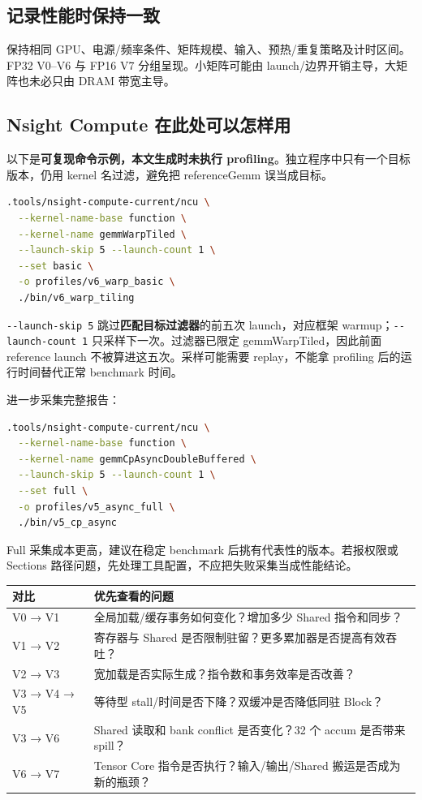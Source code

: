 \documentclass[UTF8,11pt,a4paper,fontset=fandol]{ctexart}
\newcommand{\code}[1]{\nolinkurl{#1}}
\newcommand{\pagebreakhere}{\clearpage}
\begin{document}
\subsection{记录性能时保持一致}
保持相同 GPU、电源/频率条件、矩阵规模、输入、预热/重复策略及计时区间。FP32 V0--V6 与 FP16 V7 分组呈现。小矩阵可能由 launch/边界开销主导，大矩阵也未必只由 DRAM 带宽主导。
\pagebreakhere

\subsection{Nsight Compute 在此处可以怎样用}
以下是\textbf{可复现命令示例，本文生成时未执行 profiling}。独立程序中只有一个目标版本，仍用 kernel 名过滤，避免把 referenceGemm 误当成目标。
\begin{lstlisting}[language=bash,numbers=none]
.tools/nsight-compute-current/ncu \
  --kernel-name-base function \
  --kernel-name gemmWarpTiled \
  --launch-skip 5 --launch-count 1 \
  --set basic \
  -o profiles/v6_warp_basic \
  ./bin/v6_warp_tiling
\end{lstlisting}
\code{--launch-skip 5} 跳过\textbf{匹配目标过滤器}的前五次 launch，对应框架 warmup；\code{--launch-count 1} 只采样下一次。过滤器已限定 gemmWarpTiled，因此前面 reference launch 不被算进这五次\cite{ncucli}。采样可能需要 replay，不能拿 profiling 后的运行时间替代正常 benchmark 时间\cite{ncu}。

进一步采集完整报告：
\begin{lstlisting}[language=bash,numbers=none]
.tools/nsight-compute-current/ncu \
  --kernel-name-base function \
  --kernel-name gemmCpAsyncDoubleBuffered \
  --launch-skip 5 --launch-count 1 \
  --set full \
  -o profiles/v5_async_full \
  ./bin/v5_cp_async
\end{lstlisting}
Full 采集成本更高，建议在稳定 benchmark 后挑有代表性的版本。若报权限或 Sections 路径问题，先处理工具配置，不应把失败采集当成性能结论。

\noindent\begin{tabularx}{\linewidth}{lX}
\toprule
对比 & 优先查看的问题\\\midrule
V0 → V1 & 全局加载/缓存事务如何变化？增加多少 Shared 指令和同步？\\
V1 → V2 & 寄存器与 Shared 是否限制驻留？更多累加器是否提高有效吞吐？\\
V2 → V3 & 宽加载是否实际生成？指令数和事务效率是否改善？\\
V3 → V4 → V5 & 等待型 stall/时间是否下降？双缓冲是否降低同驻 Block？\\
V3 → V6 & Shared 读取和 bank conflict 是否变化？32 个 accum 是否带来 spill？\\
V6 → V7 & Tensor Core 指令是否执行？输入/输出/Shared 搬运是否成为新的瓶颈？\\\bottomrule
\end{tabularx}
\end{document}
